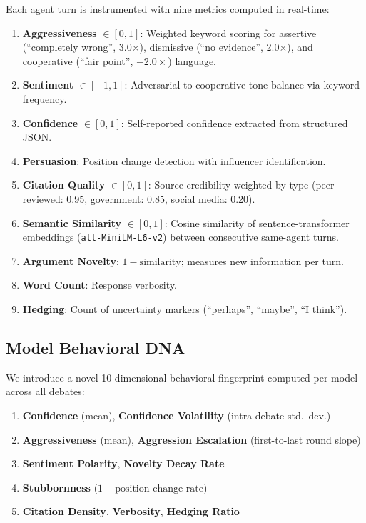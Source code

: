 \documentclass[11pt]{article}
\begin{document}
Each agent turn is instrumented with nine metrics computed in real-time:

\begin{enumerate}[leftmargin=*, topsep=2pt, itemsep=1pt]
    \item \textbf{Aggressiveness} $\in [0,1]$: Weighted keyword scoring for assertive (``completely wrong'', 3.0$\times$), dismissive (``no evidence'', 2.0$\times$), and cooperative (``fair point'', $-2.0\times$) language.
    \item \textbf{Sentiment} $\in [-1,1]$: Adversarial-to-cooperative tone balance via keyword frequency.
    \item \textbf{Confidence} $\in [0,1]$: Self-reported confidence extracted from structured JSON.
    \item \textbf{Persuasion}: Position change detection with influencer identification.
    \item \textbf{Citation Quality} $\in [0,1]$: Source credibility weighted by type (peer-reviewed: 0.95, government: 0.85, social media: 0.20).
    \item \textbf{Semantic Similarity} $\in [0,1]$: Cosine similarity of sentence-transformer embeddings (\texttt{all-MiniLM-L6-v2}) between consecutive same-agent turns.
    \item \textbf{Argument Novelty}: $1 - \text{similarity}$; measures new information per turn.
    \item \textbf{Word Count}: Response verbosity.
    \item \textbf{Hedging}: Count of uncertainty markers (``perhaps'', ``maybe'', ``I think'').
\end{enumerate}

\subsection{Model Behavioral DNA}

We introduce a novel 10-dimensional behavioral fingerprint computed per model across all debates:

\begin{enumerate}[leftmargin=*, topsep=2pt, itemsep=1pt]
    \item \textbf{Confidence} (mean), \textbf{Confidence Volatility} (intra-debate std.\ dev.)
    \item \textbf{Aggressiveness} (mean), \textbf{Aggression Escalation} (first-to-last round slope)
    \item \textbf{Sentiment Polarity}, \textbf{Novelty Decay Rate}
    \item \textbf{Stubbornness} ($1 - \text{position change rate}$)
    \item \textbf{Citation Density}, \textbf{Verbosity}, \textbf{Hedging Ratio}
\end{enumerate}
\end{document}
